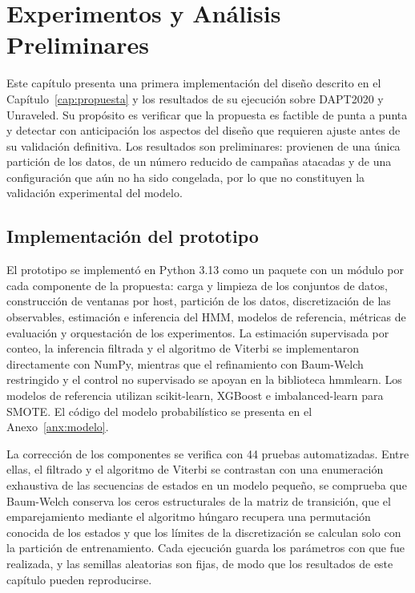 \chapter{Experimentos y Análisis Preliminares}
\label{cap:experimentos}
Este capítulo presenta una primera implementación del diseño descrito en el Capítulo~\ref{cap:propuesta} y los resultados de su ejecución sobre DAPT2020 y Unraveled. Su propósito es verificar que la propuesta es factible de punta a punta y detectar con anticipación los aspectos del diseño que requieren ajuste antes de su validación definitiva. Los resultados son preliminares: provienen de una única partición de los datos, de un número reducido de campañas atacadas y de una configuración que aún no ha sido congelada, por lo que no constituyen la validación experimental del modelo.

\section{Implementación del prototipo}
\label{sec:prototipo}
El prototipo se implementó en Python 3.13 como un paquete con un módulo por cada componente de la propuesta: carga y limpieza de los conjuntos de datos, construcción de ventanas por host, partición de los datos, discretización de las observables, estimación e inferencia del HMM, modelos de referencia, métricas de evaluación y orquestación de los experimentos. La estimación supervisada por conteo, la inferencia filtrada y el algoritmo de Viterbi se implementaron directamente con NumPy, mientras que el refinamiento con Baum-Welch restringido y el control no supervisado se apoyan en la biblioteca hmmlearn. Los modelos de referencia utilizan scikit-learn, XGBoost e imbalanced-learn para SMOTE. El código del modelo probabilístico se presenta en el Anexo~\ref{anx:modelo}.

La corrección de los componentes se verifica con 44 pruebas automatizadas. Entre ellas, el filtrado y el algoritmo de Viterbi se contrastan con una enumeración exhaustiva de las secuencias de estados en un modelo pequeño, se comprueba que Baum-Welch conserva los ceros estructurales de la matriz de transición, que el emparejamiento mediante el algoritmo húngaro recupera una permutación conocida de los estados y que los límites de la discretización se calculan solo con la partición de entrenamiento. Cada ejecución guarda los parámetros con que fue realizada, y las semillas aleatorias son fijas, de modo que los resultados de este capítulo pueden reproducirse.

